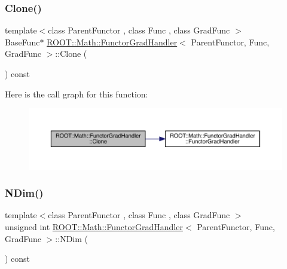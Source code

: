 \subsubsection{\texorpdfstring{Clone()}{Clone()}\hspace{0.1cm}{\footnotesize\ttfamily [2/2]}}
{\footnotesize\ttfamily template$<$class Parent\+Functor , class Func , class Grad\+Func $>$ \\
Base\+Func$\ast$ \mbox{\hyperlink{classROOT_1_1Math_1_1FunctorGradHandler}{R\+O\+O\+T\+::\+Math\+::\+Functor\+Grad\+Handler}}$<$ Parent\+Functor, Func, Grad\+Func $>$\+::Clone (\begin{DoxyParamCaption}{ }\end{DoxyParamCaption}) const\hspace{0.3cm}{\ttfamily [inline]}}

Here is the call graph for this function\+:
\nopagebreak
\begin{figure}[H]
\begin{center}
\leavevmode
\includegraphics[width=350pt]{df/df5/classROOT_1_1Math_1_1FunctorGradHandler_a20e9b0e519dc524cdf964912cf63083e_cgraph}
\end{center}
\end{figure}
\mbox{\label{classROOT_1_1Math_1_1FunctorGradHandler_a9fd1149654daac8b76a15f877663ff82}} 
\subsubsection{\texorpdfstring{NDim()}{NDim()}\hspace{0.1cm}{\footnotesize\ttfamily [1/2]}}
{\footnotesize\ttfamily template$<$class Parent\+Functor , class Func , class Grad\+Func $>$ \\
unsigned int \mbox{\hyperlink{classROOT_1_1Math_1_1FunctorGradHandler}{R\+O\+O\+T\+::\+Math\+::\+Functor\+Grad\+Handler}}$<$ Parent\+Functor, Func, Grad\+Func $>$\+::N\+Dim (\begin{DoxyParamCaption}{ }\end{DoxyParamCaption}) const\hspace{0.3cm}{\ttfamily [inline]}}

